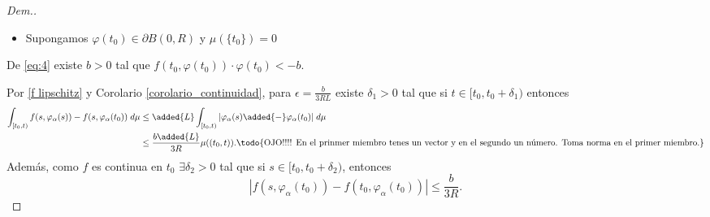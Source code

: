 \begin{proof}[Dem.]
    
\begin{itemize}
\item Supongamos $\varphi(t_0)\in \partial B(0,R)$ y $\mu(\{t_0\})= 0$ \reversemarginpar{}
\end{itemize}
De \eqref{eq:4} existe $b>0$ tal que $f(t_0,\varphi(t_0))\cdot\varphi(t_0)<-b$.

Por \eqref{f lipschitz} y Corolario \ref{corolario_continuidad}, para $\epsilon=\frac{b}{3RL}$ existe $\delta_1>0$ tal que si $t\in[t_0,t_0+\delta_1)$ entonces
\begin{equation}
    \begin{split}
         \int_{[t_0,t)} f(s,\varphi_\alpha(s))-f(s,\varphi_\alpha(t_0))\; d\mu& \leq \added{L} \int_{[t_0,t)} |\varphi_\alpha(s)\added{-}\varphi_\alpha(t_0)|\; d\mu \\ &\leq \frac{b\added{L} }{3R}\mu((t_0,t)). \textrm{\todo{OJO!!!!  En el prinmer miembro tenes un vector y en el segundo un número. Toma norma en el primer miembro.}}
     \end{split}\label{eq:A}
\end{equation}
Además, como $f$ es continua en $t_0$ $\exists \delta_2>0 $ tal que si $s\in [t_0,t_0+\delta_2)$, entonces
\begin{equation}
    |f(s,\varphi_\alpha(t_0))-f(t_0,\varphi_\alpha(t_0))|\leq \frac{b}{3R}.\label{eq:B}
\end{equation}


\end{proof}
